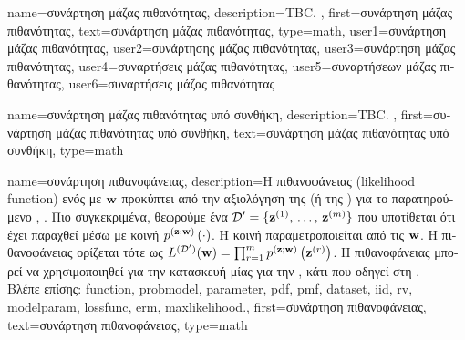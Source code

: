 {name={\foreignlanguage{greek}{συνάρτηση μάζας πιθανότητας}}, 
	description={TBC. },
	first={\foreignlanguage{greek}{συνάρτηση μάζας πιθανότητας}},
	text={\foreignlanguage{greek}{συνάρτηση μάζας πιθανότητας}},
	type=math,
	user1={\foreignlanguage{greek}{συνάρτηση μάζας πιθανότητας}}, %
  	user2={\foreignlanguage{greek}{συνάρτησης μάζας πιθανότητας}}, %
	user3={\foreignlanguage{greek}{συνάρτηση μάζας πιθανότητας}}, %
	user4={\foreignlanguage{greek}{συναρτήσεις μάζας πιθανότητας}}, %
  	user5={\foreignlanguage{greek}{συναρτήσεων μάζας πιθανότητας}}, %
	user6={\foreignlanguage{greek}{συναρτήσεις μάζας πιθανότητας}} %
}

{name={\foreignlanguage{greek}{συνάρτηση μάζας πιθανότητας υπό συνθήκη}}, 
	description={TBC. }, 
 	first={\foreignlanguage{greek}{συνάρτηση μάζας πιθανότητας υπό συνθήκη}},
 	text={\foreignlanguage{greek}{συνάρτηση μάζας πιθανότητας υπό συνθήκη}},
	type=math
}

{name={\foreignlanguage{greek}{συνάρτηση πιθανοφάνειας}},
	description={\foreignlanguage{greek}{Η}  
		\foreignlanguage{greek}{πιθανοφάνειας} (likelihood function) \foreignlanguage{greek}{ενός}  
		\foreignlanguage{greek}{με}  ${\bf w}$ \foreignlanguage{greek}{προκύπτει από την αξιολόγηση της} 
		 (\foreignlanguage{greek}{ή της} ) \foreignlanguage{greek}{για το παρατηρούμενο} 
		 \cite{LC}, \cite{CasellaBergerStatInf}. 
		\foreignlanguage{greek}{Πιο συγκεκριμένα, θεωρούμε ένα}  
		$\mathcal{D}' = \{{\bf z}^{(1)}, \,\ldots, \,{\bf z}^{(m)}\}$ 
		\foreignlanguage{greek}{που υποτίθεται ότι έχει παραχθεί μέσω}   \foreignlanguage{greek}{με κοινή} 
		 $p^{({\bf z};{\bf w})}\left(\cdot\right)$. 
		\foreignlanguage{greek}{Η κοινή}  \foreignlanguage{greek}{παραμετροποιείται από τις}  
		${\bf w}$. \foreignlanguage{greek}{Η}  \foreignlanguage{greek}{πιθανοφάνειας ορίζεται τότε ως 
		$L^{(\mathcal{D}')}({\bf w}) = \prod_{r=1}^{m} p^{({\bf z};{\bf w})}\left({\bf z}^{(r)}\right)$.
		Η}  \foreignlanguage{greek}{πιθανοφάνειας μπορεί να χρησιμοποιηθεί για την κατασκευή μίας}  
		\foreignlanguage{greek}{για την} , \foreignlanguage{greek}{κάτι που οδηγεί στη} . 
		\\
		\foreignlanguage{greek}{Βλέπε επίσης:} \gls{function}, \gls{probmodel}, \gls{parameter}, \gls{pdf}, \gls{pmf}, \gls{dataset}, \gls{iid}, 
		\gls{rv}, \gls{modelparam}, \gls{lossfunc}, \gls{erm}, \gls{maxlikelihood}.},
	first={\foreignlanguage{greek}{συνάρτηση πιθανοφάνειας}},
	text={\foreignlanguage{greek}{συνάρτηση πιθανοφάνειας}},
	type=math
}

